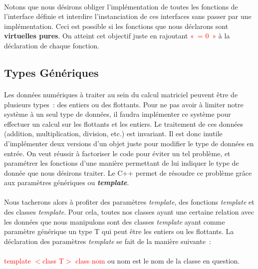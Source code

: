 \documentclass[a4paper,10pt]{report}
\begin{document}
\paragraph*{}
Notons que nous désirons obliger l’implémentation de toutes les fonctions de l’interface définie et interdire 
l’instanciation de ces interfaces sans passer par une implémentation. Ceci est possible si les fonctions que nous 
déclarons sont \textbf{virtuelles pures}. On atteint cet objectif juste en rajoutant \textcolor{red}{« = 0 »} à la déclaration de chaque fonction.

\subsection{Types Génériques}
\paragraph*{}
Les données numériques à traiter au sein du calcul matriciel peuvent être de plusieurs types : des entiers ou des flottants. 
Pour ne pas avoir à limiter notre système à un seul type de données, il faudra implémenter ce système pour effectuer un 
calcul sur les flottants et les entiers. Le traitement de ces données (addition, multiplication, division, etc.) est invariant. 
Il est donc inutile d’implémenter deux versions d’un objet juste pour modifier le type de données en entrée. On veut réussir 
à factoriser le code pour éviter un tel problème, et paramétrer les fonctions d’une manière permettant de lui indiquer le 
type de donnée que nous désirons traiter. Le C++ permet de résoudre ce problème grâce aux paramètres génériques
 ou \textbf{\textit{template}}.
\paragraph*{}
Nous tacherons alors à profiter des paramètres \textit{template}, des fonctions \textit{template} et des classes 
\textit{template}. Pour cela, toutes nos classes ayant une certaine relation avec les données que nous manipulons 
sont des classes \textit{template} ayant comme paramètre générique un type T qui peut être les entiers ou les flottants.\newline
La déclaration des paramètres \textit{template} se fait de la manière suivante :\paragraph*{}
\textcolor{red}{template $<$class T$>$ class nom} ou nom est le nom de la classe en question.
\end{document}
